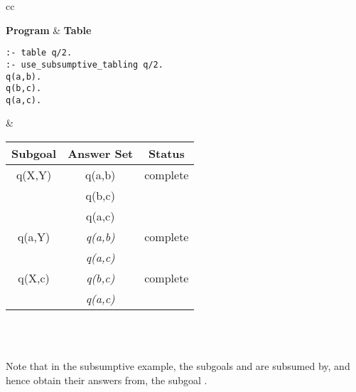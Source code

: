 \begin{center}
\begin{tabular}{cc}\hline \hline
{} \\ \hline \hline
\rule[-2ex]{0ex}{5ex} \textbf{Program} & \textbf{Table} \\
\begin{minipage}{17em}
\begin{verbatim}
:- table q/2.
:- use_subsumptive_tabling q/2.
q(a,b).
q(b,c).
q(a,c).
\end{verbatim}
\end{minipage}
&
\begin{tabular}{|c|c|c|} \hline
  Subgoal & Answer Set & Status \\ \hline \hline
  q(X,Y) & q(a,b) & complete \\
         & q(b,c) & \\
         & q(a,c) & \\ \hline
  q(a,Y) & \textit{q(a,b)} & complete \\
         & \textit{q(a,c)} & \\ \hline
  q(X,c) & \textit{q(b,c)} & complete \\
         & \textit{q(a,c)} & \\ \hline
\end{tabular} \\
\vspace*{-2ex} \\ \hline \hline
\end{tabular}
\end{center}

\noindent
Note that in the subsumptive example, the subgoals  and
 are subsumed by, and hence obtain their answers from,
the subgoal \@.

\vspace{2ex}

